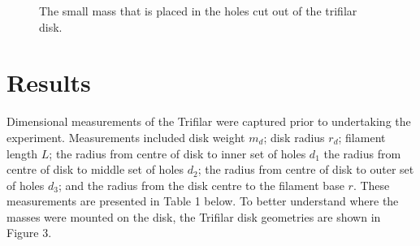 \documentclass[a4paper]{article}
\begin{document}
\begin{figure}[h]
\begin{minipage}{0.45\textwidth}
	\end{minipage}
	\hspace{1cm}
	\begin{minipage}{0.45\textwidth}
		\centering
		\caption{The small mass that is placed in the holes cut out of the trifilar disk.}
	\end{minipage}
\end{figure}

\section{Results}
Dimensional measurements of the Trifilar were captured prior to undertaking the experiment. Measurements included disk weight $m_d$; disk radius $r_d$; filament length $L$; the radius from centre of disk to inner set of holes $d_1$ the radius from centre of disk to middle set of holes $d_2$; the radius from centre of disk to outer set of holes $d_3$; and the radius from the disk centre to the filament base $r$. These measurements are presented in Table 1 below. To better understand where the masses were mounted on the disk, the Trifilar disk geometries are shown in Figure 3.

\vspace{0.15cm}
\end{document}
